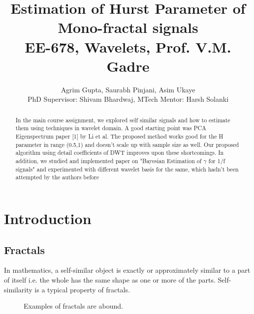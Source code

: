 \documentclass[a4paper]{article}
\title{\vspace{-2.5cm}Estimation of Hurst Parameter of Mono-fractal signals\\ EE-678, Wavelets, Prof. V.M. Gadre}
\author{Agrim Gupta, Saurabh Pinjani, Asim Ukaye \\ PhD Supervisor: Shivam Bhardwaj, MTech Mentor: Harsh Solanki}
\begin{document}
\maketitle

\begin{abstract}
In the main course assignment, we explored self similar signals and how to estimate them using techniques in wavelet domain. A good starting point was PCA Eigenspectrum paper [1] by Li et al. The proposed method works good for the H parameter in range (0.5,1) and doesn't scale up with sample size as well. Our proposed algorithm using detail coefficients of DWT improves upon these shortcomings. In addition, we studied and implemented paper on "Bayesian Estimation of $\gamma$ for 1/f signals" and experimented with different wavelet basis for the same, which hadn't been attempted by the authors before
\end{abstract}

\section{Introduction}

\subsection{Fractals}
In mathematics, a self-similar object is exactly or approximately similar to a part of itself  i.e. the whole has the same shape as one or more of the parts. Self-similarity is a typical property of fractals.

\begin{figure}[h]
    \centering
    \qquad
    \caption{Examples of fractals are abound.}%
    \label{fig:example}%
\end{figure}
\end{document}
